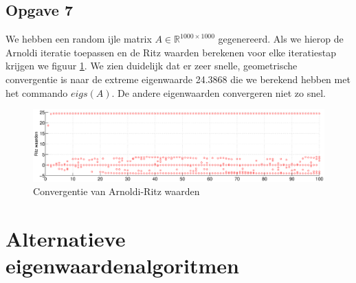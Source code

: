 \documentclass[a4paper, 12pt, titlepage]{report}
\begin{document}
\subsection{Opgave 7}
We hebben een random ijle matrix $A \in \mathbb{R}^{1000\times1000}$ gegenereerd. Als we hierop de Arnoldi iteratie toepassen en de Ritz waarden berekenen voor elke iteratiestap krijgen we figuur \ref{arnoldiGraph}. We zien duidelijk dat er zeer snelle, geometrische convergentie is naar de extreme eigenwaarde 24.3868 die we berekend hebben met het commando $eigs(A)$. De andere eigenwaarden convergeren niet zo snel. 
\begin{figure}[htb]
	\begin{center}
	 \includegraphics[width=1.2\textwidth]{arnoldi.eps}
	\caption{Convergentie van Arnoldi-Ritz waarden}
	\label{arnoldiGraph}
	\end{center}

	
\end{figure}
\section{Alternatieve eigenwaardenalgoritmen}
\end{document}
